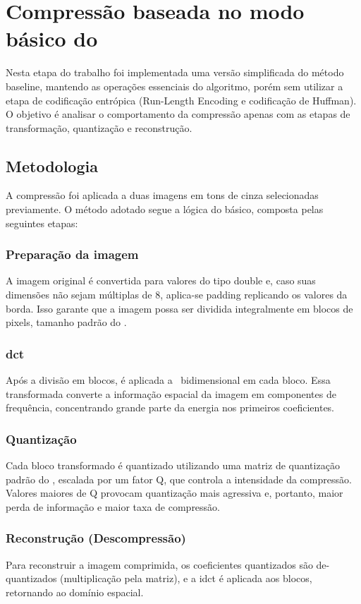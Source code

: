 \documentclass[../main.tex]{subfiles}
\begin{document}
\section{Compressão baseada no modo básico do \jpeg} 
Nesta etapa do trabalho foi implementada uma versão simplificada do método \jpeg{} baseline, mantendo as operações essenciais do algoritmo, porém sem utilizar a etapa de codificação entrópica (Run-Length Encoding e codificação de Huffman). O objetivo é analisar o comportamento da compressão apenas com as etapas de transformação, quantização e reconstrução.

\subsection{Metodologia}
A compressão foi aplicada a duas imagens em tons de cinza selecionadas previamente. O método adotado segue a lógica do \jpeg{} básico, composta pelas seguintes etapas:

\subsubsection{Preparação da imagem}
A imagem original é convertida para valores do tipo double e, caso suas dimensões não sejam múltiplas de 8, aplica-se padding replicando os valores da borda. Isso garante que a imagem possa ser dividida integralmente em blocos de  pixels, tamanho padrão do \jpeg\@.

\subsubsection{\acrfull{dct}}{}
Após a divisão em blocos, é aplicada a \dct\ bidimensional em cada bloco. Essa transformada converte a informação espacial da imagem em componentes de frequência, concentrando grande parte da energia nos primeiros coeficientes.

\subsubsection{Quantização}
Cada bloco transformado é quantizado utilizando uma matriz de quantização padrão do \jpeg{}, escalada por um fator Q, que controla a intensidade da compressão. Valores maiores de Q provocam quantização mais agressiva e, portanto, maior perda de informação e maior taxa de compressão.

\subsubsection{Reconstrução (Descompressão)}
Para reconstruir a imagem comprimida, os coeficientes quantizados são de-quantizados (multiplicação pela matriz), e a \acrfull{idct} é aplicada aos blocos, retornando ao domínio espacial.
\end{document}
